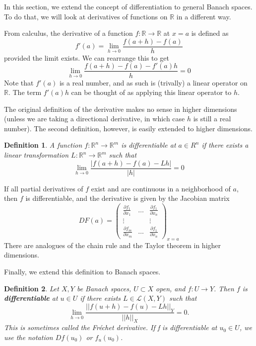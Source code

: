 \documentclass[12pt]{amsart}         %
\newtheorem{definition}{Definition}[section]
\theoremstyle{remark}
\newcommand{\R}{\mathbb{R}}
\begin{document}
In this section, we extend the concept of differentiation to general Banach spaces. To do that, we will look at derivatives of functions on $\R$ in a different way.

From calculus, the derivative of a function $f: \R \rightarrow \R$ at $x = a$ is defined as 
\[
f'(a) = \lim_{h \rightarrow 0}\frac{f(a + h) - f(a)}{h}
\]
provided the limit exists. We can rearrange this to get
\[
\lim_{h \rightarrow 0}\frac{f(a + h) - f(a) - f'(a) h }{h} = 0
\]
Note that $f'(a)$ is a real number, and as such is (trivally) a linear operator on $\R$. The term $f'(a) h$ can be thought of as applying this linear operator to $h$.

The original definition of the derivative makes no sense in higher dimensions (unless we are taking a directional derivative, in which case $h$ is still a real number). The second definition, however, is easily extended to higher dimensions.

\begin{definition}
A function $f:\R^n \rightarrow \R^m$ is \emph{differentiable} at $a \in R^n$ if there exists a linear transformation $L: \R^n \rightarrow \R^m$ such that
\[
\lim_{h \rightarrow 0}\frac{|f(a + h) - f(a) - L h |}{|h|} = 0
\]
\end{definition}

If all partial derivatives of $f$ exist and are continuous in a neighborhood of $a$, then $f$ is differentiable, and the derivative is given by the Jacobian matrix
\[
DF(a) = \begin{pmatrix}
\frac{\partial f_1}{\partial x_1} & \dots & \frac{\partial f_1}{\partial x_n} \\
\vdots && \vdots \\
\frac{\partial f_m}{\partial x_m} & \dots & \frac{\partial f_1}{\partial x_n} 
\end{pmatrix}_{x = a}
\]
There are analogues of the chain rule and the Taylor theorem in higher dimensions. 

Finally, we extend this definition to Banach spaces.

\begin{definition}
Let $X, Y$ be Banach spaces, $U \subset X$ open, and $f \colon U \rightarrow Y$. Then $f$ is \textbf{differentiable} at $u \in U$ if there exists $L \in \mathcal{L}(X, Y)$ such that
\[
\lim_{h \rightarrow 0} \frac{ ||f(u + h) - f(u) - Lh ||_Y}{||h||_X} = 0.
\]
This is sometimes called the Fr\'{e}chet derivative. If f is differentiable at $u_0 \in U$, we use the notation $Df(u_0)$ or $f_u(u_0)$.
\end{definition}
\end{document}
